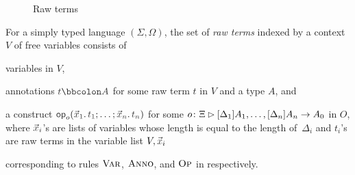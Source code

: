 \begin{definition}
\begin{figure}
  \centering
  \small
  \caption{Raw terms}
  \label{fig:raw-terms}
\end{figure}
  For a simply typed language $(\Sigma, \Omega)$, the set of \emph{raw terms} indexed by a context~$V$ of free variables consists of
  \begin{enumerate*}
    \item variables in $V$,
    \item annotations $\isTerm{t \annotate A}$ for some raw term $t$ in $V$ and a type $A$, and
    \item a construct $\tmOpts$ for some $o\colon \Xi \rhd [\Delta_1]A_{1}, \ldots, [\Delta_{n}] A_{n} \to A_0$ in $O$, where $\vars{x}_{\isTerm{i}}$'s are lists of variables whose length is equal to the length of~$\Delta_i$ and $t_i$'s are raw terms in the variable list $V, \vars{x}_i$
  \end{enumerate*}
  corresponding to rules $\textnormal{\textsc{Var}}$, $\textnormal{\textsc{Anno}}$, and $\textnormal{\textsc{Op}}$ in  respectively.
\end{definition}


